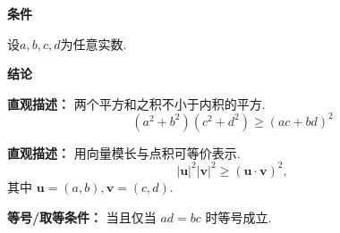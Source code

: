 \begin{statementbox}
	\textbf{\textcolor{CStatement}{条件}}
	\begin{description}[style=nextline, leftmargin=2.8em, labelsep=0.5em, itemsep=0.35em]
		\item[\textbf{\textcolor{CStatement}{条件1（变量范围）：}}] 设$a,b,c,d$为任意实数.
	\end{description}

	\textbf{\textcolor{CStatement}{结论}}
	\begin{description}[style=nextline, leftmargin=2.8em, labelsep=0.5em, itemsep=0.45em]
		\item[\textbf{\textcolor{CStatement}{结论一（二维柯西不等）：}}]
		      \textbf{\textcolor{CStatement}{直观描述：}}
		      两个平方和之积不小于内积的平方.
		      \[
			      (a^{2}+b^{2})(c^{2}+d^{2})\ge (ac+bd)^{2}
		      \]

		\item[\textbf{\textcolor{CStatement}{常见变形（向量形式）：}}]
		      \textbf{\textcolor{CStatement}{直观描述：}}
		      用向量模长与点积可等价表示.
		      \[
			      |\boldsymbol{u}|^{2}|\boldsymbol{v}|^{2}\ge (\boldsymbol{u}\cdot\boldsymbol{v})^{2},
		      \]
		      其中 $\boldsymbol{u}=(a,b), \boldsymbol{v}=(c,d)$.
	\end{description}

	\textbf{\textcolor{CStatement}{等号/取等条件：}}
	当且仅当 $ad=bc$ 时等号成立.
\end{statementbox}